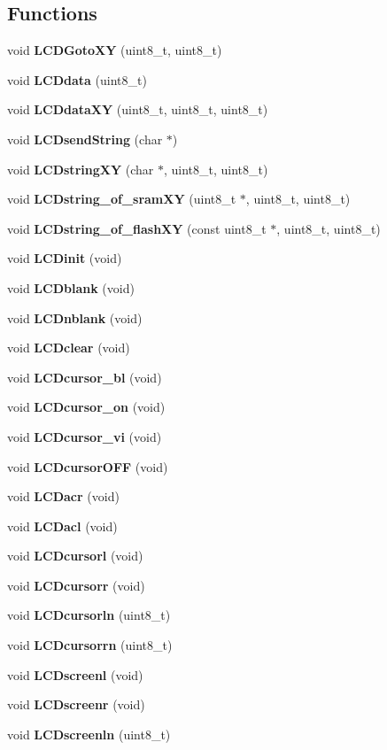 \subsection*{Functions}
\begin{DoxyCompactItemize}
\item 
void \textbf{ L\+C\+D\+Goto\+XY} (uint8\+\_\+t, uint8\+\_\+t)
\item 
void \textbf{ L\+C\+Ddata} (uint8\+\_\+t)
\item 
void \textbf{ L\+C\+Ddata\+XY} (uint8\+\_\+t, uint8\+\_\+t, uint8\+\_\+t)
\item 
void \textbf{ L\+C\+Dsend\+String} (char $\ast$)
\item 
void \textbf{ L\+C\+Dstring\+XY} (char $\ast$, uint8\+\_\+t, uint8\+\_\+t)
\item 
void \textbf{ L\+C\+Dstring\+\_\+of\+\_\+sram\+XY} (uint8\+\_\+t $\ast$, uint8\+\_\+t, uint8\+\_\+t)
\item 
void \textbf{ L\+C\+Dstring\+\_\+of\+\_\+flash\+XY} (const uint8\+\_\+t $\ast$, uint8\+\_\+t, uint8\+\_\+t)
\item 
void \textbf{ L\+C\+Dinit} (void)
\item 
void \textbf{ L\+C\+Dblank} (void)
\item 
void \textbf{ L\+C\+Dnblank} (void)
\item 
void \textbf{ L\+C\+Dclear} (void)
\item 
void \textbf{ L\+C\+Dcursor\+\_\+bl} (void)
\item 
void \textbf{ L\+C\+Dcursor\+\_\+on} (void)
\item 
void \textbf{ L\+C\+Dcursor\+\_\+vi} (void)
\item 
void \textbf{ L\+C\+Dcursor\+O\+FF} (void)
\item 
void \textbf{ L\+C\+Dacr} (void)
\item 
void \textbf{ L\+C\+Dacl} (void)
\item 
void \textbf{ L\+C\+Dcursorl} (void)
\item 
void \textbf{ L\+C\+Dcursorr} (void)
\item 
void \textbf{ L\+C\+Dcursorln} (uint8\+\_\+t)
\item 
void \textbf{ L\+C\+Dcursorrn} (uint8\+\_\+t)
\item 
void \textbf{ L\+C\+Dscreenl} (void)
\item 
void \textbf{ L\+C\+Dscreenr} (void)
\item 
void \textbf{ L\+C\+Dscreenln} (uint8\+\_\+t)
\item 

\end{DoxyCompactItemize}
